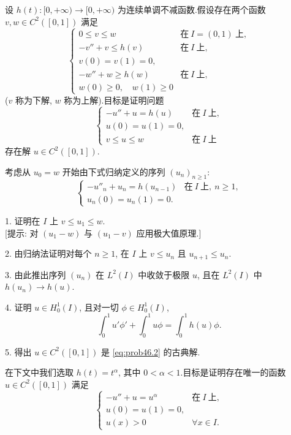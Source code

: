 \begin{problem}
\label{prob:46}
设 $h(t):[0,+\infty)\to[0,+\infty)$ 为连续单调不减函数.假设存在两个函数
$v,w\in C^2([0,1])$ 满足
\begin{equation}
\begin{cases}
0\le v\le w & \text{在}\ I=(0,1)\ \text{上},\\
-v''+v\le h(v) & \text{在}\ I\ \text{上},\\
v(0)=v(1)=0,\\
-w''+w\ge h(w) & \text{在}\ I\ \text{上},\\
w(0)\ge0,\quad w(1)\ge0
\end{cases}
\label{eq:prob46.1}
\end{equation}
($v$ 称为下解, $w$ 称为上解).目标是证明问题
\begin{equation}
\begin{cases}
-u''+u=h(u) & \text{在}\ I\ \text{上},\\
u(0)=u(1)=0,\\
v\le u\le w & \text{在}\ I\ \text{上}
\end{cases}
\label{eq:prob46.2}
\end{equation}
存在解 $u\in C^2([0,1])$.

考虑从 $u_0=w$ 开始由下式归纳定义的序列 $(u_n)_{n\ge1}$:
\begin{equation}
\begin{cases}
-u''_n+u_n=h(u_{n-1}) & \text{在}\ I\ \text{上},\ n\ge1,\\
u_n(0)=u_n(1)=0.
\end{cases}
\label{eq:prob46.3}
\end{equation}

1. 证明在 $I$ 上 $v\le u_1\le w$.\\
{[提示: 对 $(u_1-w)$ 与 $(u_1-v)$ 应用极大值原理.]}

2. 由归纳法证明对每个 $n\ge1$, 在 $I$ 上 $v\le u_n$ 且 $u_{n+1}\le u_n$.

3. 由此推出序列 $(u_n)$ 在 $L^2(I)$ 中收敛于极限 $u$, 且在 $L^2(I)$ 中 $h(u_n)\to h(u)$.

4. 证明 $u\in H_0^1(I)$, 且对一切 $\phi\in H_0^1(I)$,
\begin{equation*}
\int_0^1u'\phi'+\int_0^1u\phi=\int_0^1h(u)\phi.
\end{equation*}

5. 得出 $u\in C^2([0,1])$ 是 \eqref{eq:prob46.2} 的古典解.

在下文中我们选取 $h(t)=t^\alpha$, 其中 $0<\alpha<1$.目标是证明存在唯一的函数
$u\in C^2([0,1])$ 满足
\begin{equation}
\begin{cases}
-u''+u=u^\alpha & \text{在}\ I\ \text{上},\\
u(0)=u(1)=0,\\
u(x)>0 & \forall x\in I.
\end{cases}
\label{eq:prob46.4}
\end{equation}


\end{problem}
